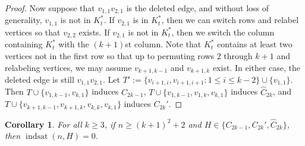 \documentclass[12pt]{amsart}
\theoremstyle{plain}
\newtheorem{cor}{Corollary}[thm]
\theoremstyle{definition}
\theoremstyle{remark}
\newcommand{\indsat}[2]{\ensuremath{\operatorname{indsat}(#1,#2)}\xspace}
\begin{document}
\begin{proof}
Now suppose that $v_{1,1}v_{2,1}$ is the deleted edge, and without loss of generality,  $v_{1,1}$ is not in $K_t^*$.  If $v_{2,1}$ is in $K_t^*$, then we can switch rows and relabel vertices so that $v_{2,2}$ exists.  If $v_{2,1}$ is not in $K_t^*$, then we switch the column containing $K_t^*$ with the $(k+1)$st column.  Note that $K_t^*$ contains at least two vertices not in the first row so that up to permuting rows 2 through $k+1$ and relabeling vertices, we may assume $v_{k+1,k-1}$ and $v_{k+1,k}$ exist.  In either case, the deleted edge is still $v_{1,1}v_{2,1}$.  Let $T' := \{v_{i+1,i}, v_{i+1,i+1}: 1 \le i \le k - 2\} \cup \{v_{1,1}\}$.  Then $T \cup \{v_{1,k-1}, v_{k,1}\}$ induces $C_{2k-1}$, $T \cup \{v_{1,k-1}, v_{1,k}, v_{k,1}\}$ induces $\hat C_{2k}$, and $T \cup \{v_{k+1,k-1}, v_{k+1,k}, v_{k,k}, v_{k,1}\}$ induces $C_{2k}'$.
%
%
%
%
\end{proof}

\begin{cor}\label{cor:cycles}
For all $k \geq 3$, if $n \geq (k+1)^2+2$ and $H\in\{C_{2k-1},C_{2k}',\hat C_{2k}\}$, then $\indsat nH =0$.
\end{cor}
\end{document}
